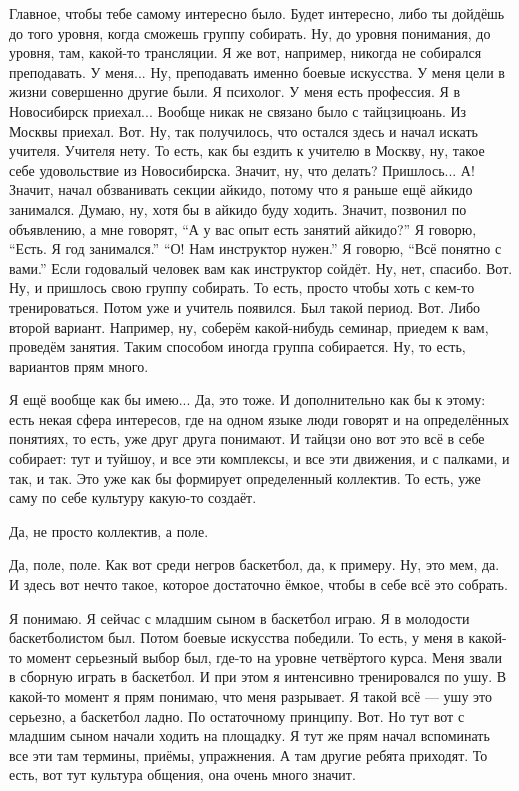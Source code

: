 \A
Главное, чтобы тебе самому
интересно было. Будет интересно,
либо ты
дойдёшь до того
уровня, когда сможешь
группу собирать.
Ну, до уровня понимания,
до уровня, там, какой-то
трансляции. Я же вот, например,
никогда не собирался преподавать.
У меня... Ну,
преподавать именно боевые искусства.
У меня цели в жизни
совершенно другие были. Я психолог.
У меня есть профессия.
Я в Новосибирск приехал...
Вообще никак не связано
было с тайцзицюань.
Из Москвы приехал. Вот.
Ну, так получилось, что остался здесь
и начал искать учителя.
Учителя нету.
То есть, как бы ездить к учителю в Москву,
ну, такое себе
удовольствие из Новосибирска.
Значит, ну,
что делать? Пришлось... А!
Значит, начал обзванивать
секции айкидо, потому что я раньше
ещё айкидо занимался. Думаю, ну,
хотя бы в айкидо буду ходить.
Значит,
позвонил по объявлению,
а мне говорят,
``А у вас опыт есть
занятий айкидо?'' Я говорю, ``Есть. Я год
занимался.'' ``О! Нам инструктор
нужен.'' Я говорю, ``Всё понятно с вами.''
Если годовалый
человек вам как инструктор сойдёт.
Ну, нет, спасибо.
Вот. Ну, и
пришлось свою группу собирать.
То есть, просто чтобы хоть с кем-то
тренироваться. Потом
уже и учитель появился.
Был такой
период. Вот.
Либо второй вариант. Например,
ну, соберём какой-нибудь семинар,
приедем к вам, проведём занятия.
Таким способом
иногда группа
собирается. Ну, то есть,
вариантов прям много.

\I
Я ещё вообще
как бы имею...
Да, это тоже. И
дополнительно как бы
к этому: есть
некая
сфера интересов, где
на одном языке люди говорят
и на определённых
понятиях, то есть, уже
друг друга
понимают. И тайцзи
оно вот это всё в себе собирает:
тут и туйшоу, и
все эти комплексы, и все эти движения,
и с палками, и так, и так.
Это уже как бы формирует
определенный
коллектив. То есть,
уже саму по себе культуру какую-то
создаёт.

\A Да, не просто коллектив,
а поле.

\I Да, поле, поле.
Как вот среди негров
баскетбол, да, к примеру. Ну, это мем, да.
И здесь вот нечто такое,
которое достаточно ёмкое, чтобы
в себе всё это собрать.

\A
Я понимаю.
Я сейчас с младшим сыном
в баскетбол играю. Я в молодости
баскетболистом был.
Потом боевые искусства победили.
То есть, у меня в какой-то момент серьезный
выбор был, где-то на уровне
четвёртого курса.
Меня звали в сборную
играть в баскетбол.
И при этом я интенсивно
тренировался по ушу. В какой-то момент
я прям понимаю, что меня
разрывает. Я такой
всё --- ушу это серьезно, а баскетбол
ладно. По остаточному принципу.
Вот.
Но тут вот с младшим сыном
начали ходить на площадку.
Я тут же прям
начал вспоминать все эти
там термины, приёмы,
упражнения.
А там другие ребята приходят.
То есть, вот тут
культура общения, она очень много
значит.

